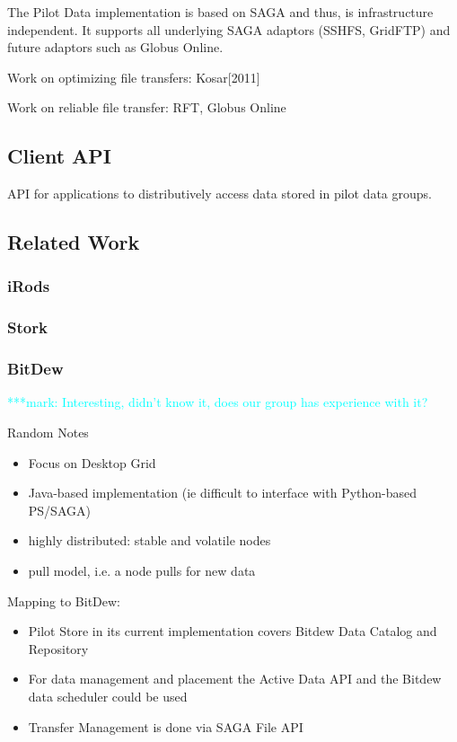 \documentclass[]{article}
\newcommand{\msnote}[1]{ {\textcolor{cyan} { ***mark: #1 }}}
\begin{document}
The Pilot Data implementation is based on SAGA and thus, is infrastructure
independent. It supports all underlying SAGA adaptors (SSHFS, GridFTP) and
future adaptors such as Globus Online.

Work on optimizing file transfers: Kosar[2011]

Work on reliable file transfer: RFT, Globus Online

\subsection{Client API}

API for applications to distributively access data stored in pilot data groups.

\subsection{Related Work}

\subsubsection{iRods}


\subsubsection{Stork}


\subsubsection{BitDew}
\msnote{Interesting, didn't know it, does our group has experience with it?}

Random Notes
\begin{itemize}
	\item Focus on Desktop Grid
	\item Java-based implementation (ie difficult to interface with Python-based PS/SAGA)
	\item highly distributed: stable and volatile nodes
	\item pull model, i.e. a node pulls for new data
\end{itemize}


Mapping to BitDew:
\begin{itemize}
	\item Pilot Store in its current implementation covers Bitdew Data Catalog and Repository
	\item For data management and placement the Active Data API and the Bitdew data scheduler could be used
	\item Transfer Management is done via SAGA File API	
\end{itemize}
\end{document}
